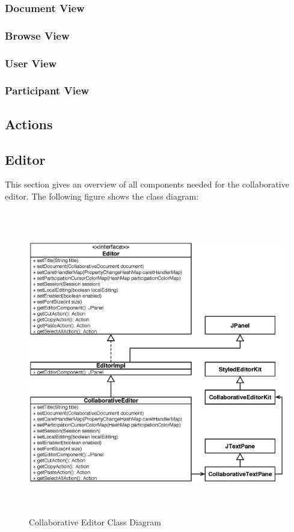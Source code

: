 \subsubsection{Document View}
\subsubsection{Browse View}


\subsubsection{User View}
\subsubsection{Participant View}

\subsection{Actions}

\subsection{Editor}
This section gives an overview of all components needed for the collaborative editor. The following figure shows the class diagram:
\begin{figure}[H]
\begin{center}
  \includegraphics[height=5.25in, width=5.55in]{../images/finalreport/application_editor.eps}
\caption{Collaborative Editor Class Diagram}
\label{application_editor}
\end{center}
\end{figure}

